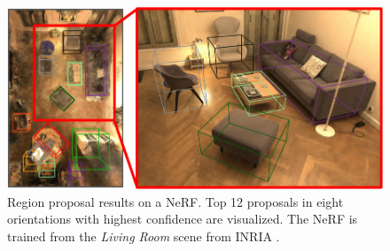 \begin{figure}[t]
\centering
    \includegraphics[width=1\linewidth]{figs/teaser.pdf}
    \vspace{-0.15in}
    \caption{Region proposal results on a NeRF. Top 12 proposals in eight orientations with highest confidence are visualized. The NeRF is trained from the \textit{Living Room} scene from INRIA \cite{inriadataset}.}\vspace{-0.15in}
    \label{fig:teaser}
\end{figure}
